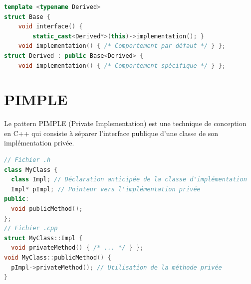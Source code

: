\documentclass{article}
\begin{document}
\begin{multicols*}{3}
\begin{lstlisting}[language=C++]
template <typename Derived>
struct Base {
    void interface() {
        static_cast<Derived*>(this)->implementation(); }
    void implementation() { /* Comportement par défaut */ } };
struct Derived : public Base<Derived> {
    void implementation() { /* Comportement spécifique */ } };
\end{lstlisting}

\section*{PIMPLE}
Le pattern PIMPLE (Private Implementation) est une technique de conception en C++ qui consiste à séparer l'interface publique d'une classe de son implémentation privée.

\begin{lstlisting}[language=C++]
// Fichier .h
class MyClass {
  class Impl; // Déclaration anticipée de la classe d'implémentation
  Impl* pImpl; // Pointeur vers l'implémentation privée
public:
  void publicMethod();
};
// Fichier .cpp
struct MyClass::Impl {
  void privateMethod() { /* ... */ } };
void MyClass::publicMethod() {
  pImpl->privateMethod(); // Utilisation de la méthode privée
}
\end{lstlisting}



\end{multicols*}
\end{document}
